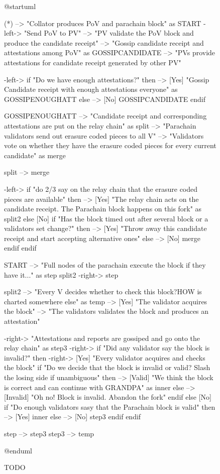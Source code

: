 \documentclass{book}
\begin{document}
\begin{figure}[h!]
\begin{plantuml}
@startuml

(*) --> "Collator produces PoV and parachain block" as START
-left-> "Send PoV to PV"
--> "PV validate the PoV block and produce the candidate receipt"
--> "Gossip candidate receipt and attestations among PoV" as GOSSIPCANDIDATE
--> "PVs provide attestations for candidate receipt generated by other PV"

-left-> if "Do we have enough attestations?" then
    --> [Yes] "Gossip Candidate receipt with enough attestations everyone" as GOSSIPENOUGHATT
else
    --> [No] GOSSIPCANDIDATE
endif

GOSSIPENOUGHATT --> "Candidate receipt and corresponding attestations are put on the relay chain" as split
--> "Parachain validators send out erasure coded pieces to all V"
--> "Validators vote on whether they have the erasure coded pieces for every current candidate" as merge

split --> merge

-left-> if "do 2/3 say on the relay chain that the erasure coded pieces are available" then
    --> [Yes] "The relay chain acts on the candidate receipt. The Parachain block happens on this fork" as split2
else
    [No] if "Has the block timed out after several block or a validators set change?" then
        --> [Yes] "Throw away this candidate receipt and start accepting alternative ones"
    else
        --> [No] merge
    endif
endif

START --> "Full nodes of the parachain execute the block if they have it..." as step
split2 -right-> step

split2 --> "Every V decides whether to check this block?HOW is charted somewhere else" as temp
--> [Yes] "The validator acquires the block"
--> "The validators validates the block and produces an attestation"

-right-> "Attestations and reports are gossiped and go onto the relay chain" as step3
-right-> if "Did any validator say the block is invalid?" then
    -right-> [Yes] "Every validator acquires and checks the block"
    if "Do we decide that the block is invalid or valid? Slash the losing side if unambiguous" then
        --> [Valid] "We think the block is correct and can continue with GRANDPA" as inner
    else
        --> [Invalid] "Oh no! Block is invalid. Abandon the fork"
    endif
else
    [No] if "Do enough validators sasy that the Parachain block is valid" then
        --> [Yes] inner
    else
        --> [No] step3
    endif
endif

step --> step3
step3 --> temp

@enduml
\end{plantuml}
\caption{TODO}
\end{figure}
\end{document}
